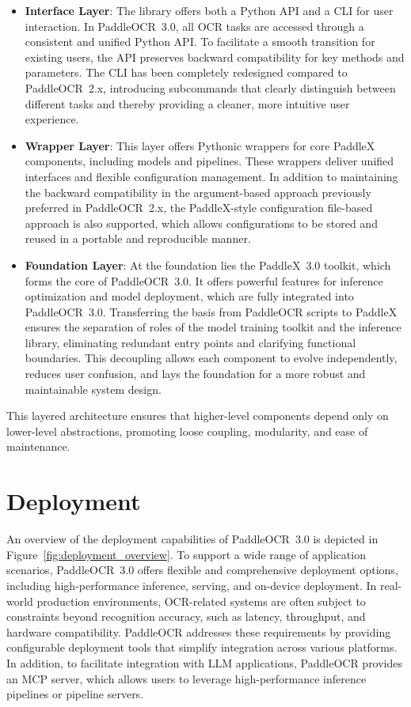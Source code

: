 \documentclass[11pt, a4paper, logo, copyright, nonumbering]{paddleocr}
\begin{document}
\begin{itemize}
    \item \textbf{Interface Layer}: The library offers both a Python API and a CLI for user interaction. In PaddleOCR~3.0, all OCR tasks are accessed through a consistent and unified Python API. To facilitate a smooth transition for existing users, the API preserves backward compatibility for key methods and parameters. The CLI has been completely redesigned compared to PaddleOCR~2.x, introducing subcommands that clearly distinguish between different tasks and thereby providing a cleaner, more intuitive user experience.
    
    \item \textbf{Wrapper Layer}: This layer offers Pythonic wrappers for core PaddleX components, including models and pipelines. These wrappers deliver unified interfaces and flexible configuration management. In addition to maintaining the backward compatibility in the argument-based approach previously preferred in PaddleOCR~2.x, the PaddleX-style configuration file-based approach is also supported, which allows configurations to be stored and reused in a portable and reproducible manner.
    
    \item \textbf{Foundation Layer}: At the foundation lies the PaddleX~3.0 toolkit, which forms the core of PaddleOCR~3.0. It offers powerful features for inference optimization and model deployment, which are fully integrated into PaddleOCR~3.0. Transferring the basis from PaddleOCR scripts to PaddleX ensures the separation of roles of the model training toolkit and the inference library, eliminating redundant entry points and clarifying functional boundaries. This decoupling allows each component to evolve independently, reduces user confusion, and lays the foundation for a more robust and maintainable system design.
\end{itemize}

This layered architecture ensures that higher-level components depend only on lower-level abstractions, promoting loose coupling, modularity, and ease of maintenance.




\section{Deployment}\label{sec:deployment}

An overview of the deployment capabilities of PaddleOCR~3.0 is depicted in Figure~\ref{fig:deployment_overview}. To support a wide range of application scenarios, PaddleOCR~3.0 offers flexible and comprehensive deployment options, including high-performance inference, serving, and on-device deployment. In real-world production environments, OCR-related systems are often subject to constraints beyond recognition accuracy, such as latency, throughput, and hardware compatibility. PaddleOCR addresses these requirements by providing configurable deployment tools that simplify integration across various platforms. In addition, to facilitate integration with LLM applications, PaddleOCR provides an MCP server, which allows users to leverage high-performance inference pipelines or pipeline servers.
\end{document}
